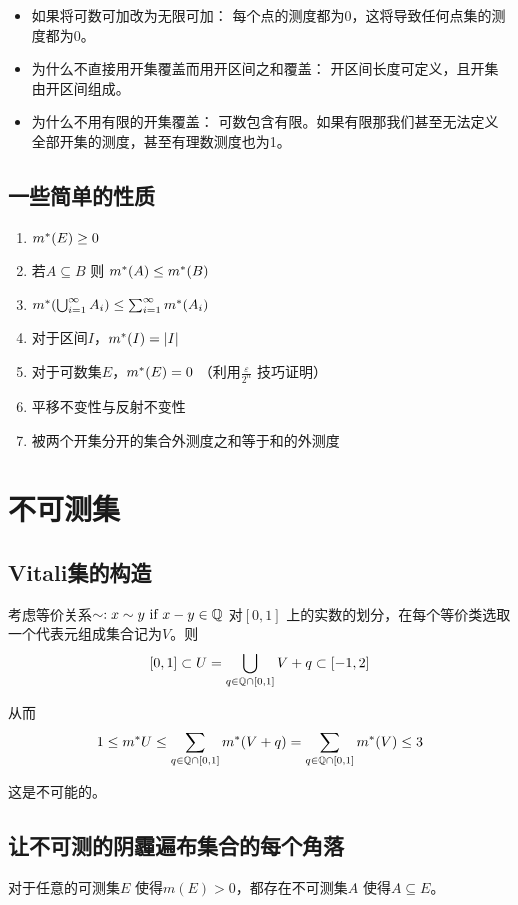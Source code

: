 \begin{itemize}
    \item 如果将可数可加改为无限可加： 每个点的测度都为0，这将导致任何点集的测度都为0。
    \item 为什么不直接用开集覆盖而用开区间之和覆盖： 开区间长度可定义，且开集由开区间组成。
    \item 为什么不用有限的开集覆盖： 可数包含有限。如果有限那我们甚至无法定义全部开集的测度，甚至有理数测度也为1。
\end{itemize}

\subsection{一些简单的性质}
\begin{enumerate}
    \item \(m^{*}(E)\geq 0\)
    \item 若\(A \subseteq B\) 则 \(m^{*}(A) \leq m^{*}(B)\)
    \item \(m^{*}(\bigcup_{i=1}^{\infty} A_{i}) \leq
        \sum_{i=1}^{\infty} m^{*}(A_{i})\)
    \item 对于区间\(I\)，\(m^{*}(I) = |I|\)
    \item 对于可数集\(E\)，\(m^{*}(E) = 0\)
        （利用\(\frac{\varepsilon}{2^{n}}\) 技巧证明）
    \item 平移不变性与反射不变性
    \item 被两个开集分开的集合外测度之和等于和的外测度

\end{enumerate}

\section{不可测集}

\subsection{Vitali集的构造}
考虑等价关系\(\sim: x\sim y \text{ if } x-y \in \mathbb{Q}\) 对\([0,1]\)
上的实数的划分，在每个等价类选取一个代表元组成集合记为\(V\)。则\[
    [0,1] \subset U=\bigcup_{q \in \mathbb{Q}\cap[0,1]} V+q \subset [-1,2]
\]

从而\[
    1\leq m^{*} U \leq \sum_{q \in \mathbb{Q}\cap[0,1]} m^{*}(V+q) = \sum_{q \in
    \mathbb{Q}\cap[0,1]} m^{*}(V) \leq 3
\]

这是不可能的。

\subsection{让不可测的阴霾遍布集合的每个角落}
\begin{theorem}{}{}
    对于任意的可测集\(E\) 使得\(m(E)>0\)，都存在不可测集\(A\) 使得\(A \subseteq E\)。
\end{theorem}

